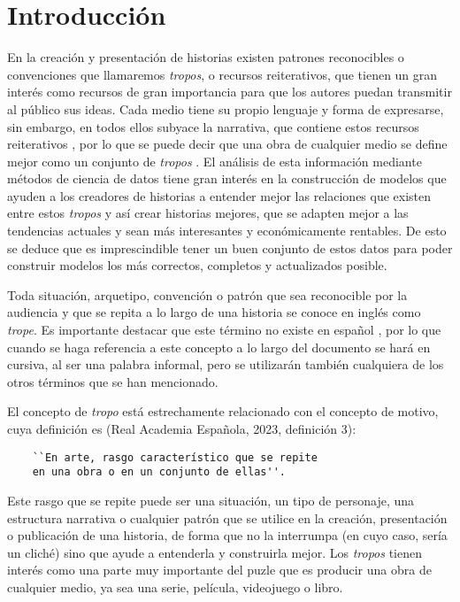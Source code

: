 \chapter{Introducción}
En la creación y presentación de historias existen patrones reconocibles o
convenciones que llamaremos \textit{tropos}, o recursos reiterativos, que tienen
un gran interés como recursos de gran importancia para que los autores puedan
transmitir al público sus ideas. Cada medio tiene su propio lenguaje y forma de
expresarse, sin embargo, en todos ellos subyace la narrativa, que contiene estos
recursos reiterativos \cite{garcia2021simpsons}, por lo que se puede decir que
una obra de cualquier medio se define mejor como un conjunto de \textit{tropos}
\cite{garcia2020tropes}. El análisis de esta información mediante métodos de
ciencia de datos tiene gran interés en la construcción de modelos que ayuden a
los creadores de historias a entender mejor las relaciones que existen entre
estos \textit{tropos} y así crear historias mejores, que se adapten mejor a las
tendencias actuales y sean más interesantes y económicamente rentables. De esto
se deduce que es imprescindible tener un buen conjunto de estos datos para poder
construir modelos los más correctos, completos y actualizados posible.

Toda situación, arquetipo, convención o patrón que sea reconocible por la
audiencia y que se repita a lo largo de una historia se conoce en inglés como
\textit{trope}. Es importante destacar que este término no existe en español
\cite{tesisruben}, por lo que cuando se haga referencia a este concepto a lo
largo del documento se hará en cursiva, al ser una palabra informal, pero se
utilizarán también cualquiera de los otros términos que se han mencionado.

El concepto de \textit{tropo} está estrechamente relacionado con el concepto de
motivo, cuya definición es (Real Academia Española, 2023, definición 3): 

\begin{verbatim}
    ``En arte, rasgo característico que se repite 
    en una obra o en un conjunto de ellas''.
\end{verbatim}


Este rasgo que se repite puede ser una situación, un tipo de personaje, una
estructura narrativa o cualquier patrón que se utilice en la creación,
presentación o publicación de una historia, de forma que no la interrumpa (en
cuyo caso, sería un cliché) sino que ayude a entenderla y construirla mejor. Los
\textit{tropos} tienen interés como una parte muy importante del puzle que es
producir una obra de cualquier medio, ya sea una serie, película, videojuego o
libro. 

